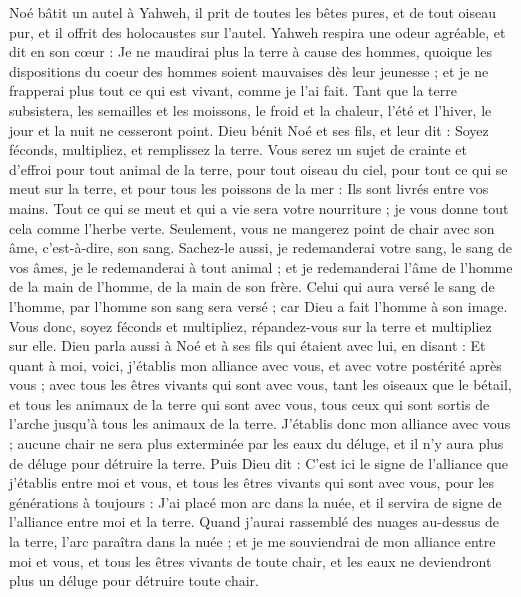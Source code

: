 \begin{multicols}{2}
Noé bâtit un autel à Yahweh, il prit de toutes les bêtes pures, et de tout oiseau pur, et il offrit des holocaustes sur l'autel.
Yahweh respira une odeur agréable, et dit en son cœur : Je ne maudirai plus la terre à cause des hommes, quoique les dispositions du coeur des hommes soient mauvaises dès leur jeunesse ; et je ne frapperai plus tout ce qui est vivant, comme je l’ai fait.
Tant que la terre subsistera, les semailles et les moissons, le froid et la chaleur, l'été et l'hiver, le jour et la nuit ne cesseront point.
\VerseOne{}Dieu bénit Noé et ses fils, et leur dit : Soyez féconds, multipliez, et remplissez la terre.
Vous serez un sujet de crainte et d’effroi pour tout animal de la terre, pour tout oiseau du ciel, pour tout ce qui se meut sur la terre, et pour tous les poissons de la mer : Ils sont livrés entre vos mains.
Tout ce qui se meut et qui a vie sera votre nourriture ; je vous donne tout cela comme l'herbe verte.
Seulement, vous ne mangerez point de chair avec son âme, c'est-à-dire, son sang.
Sachez-le aussi, je redemanderai votre sang, le sang de vos âmes, je le redemanderai à tout animal ; et je redemanderai l’âme de l’homme de la main de l’homme, de la main de son frère.
Celui qui aura versé le sang de l'homme, par l'homme son sang sera versé ; car Dieu a fait l'homme à son image.
Vous donc, soyez féconds et multipliez, répandez-vous sur la terre et multipliez sur elle.
Dieu parla aussi à Noé et à ses fils qui étaient avec lui, en disant :
Et quant à moi, voici, j'établis mon alliance avec vous, et avec votre postérité après vous ;
avec tous les êtres vivants qui sont avec vous, tant les oiseaux que le bétail, et tous les animaux de la terre qui sont avec vous, tous ceux qui sont sortis de l'arche jusqu'à tous les animaux de la terre.
J'établis donc mon alliance avec vous ; aucune chair ne sera plus exterminée par les eaux du déluge, et il n'y aura plus de déluge pour détruire la terre.
Puis Dieu dit : C'est ici le signe de l'alliance que j’établis entre moi et vous, et tous les êtres vivants qui sont avec vous, pour les générations à toujours :
J’ai placé mon arc dans la nuée, et il servira de signe de l'alliance entre moi et la terre.
Quand j’aurai rassemblé des nuages au-dessus de la terre, l’arc paraîtra dans la nuée ;
et je me souviendrai de mon alliance entre moi et vous, et tous les êtres vivants de toute chair, et les eaux ne deviendront plus un déluge pour détruire toute chair.

\end{multicols}
